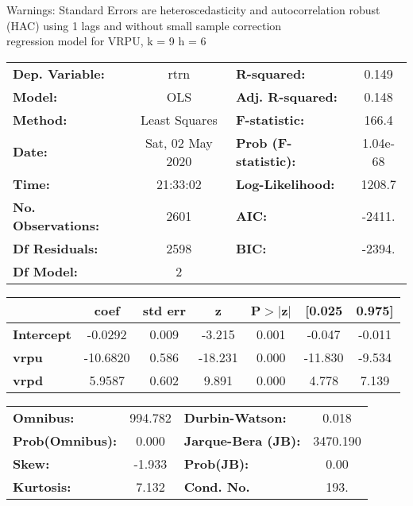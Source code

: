 Warnings: \newline
 [1] Standard Errors are heteroscedasticity and autocorrelation robust (HAC) using 1 lags and without small sample correction\\ 

regression model for VRPU, k = 9 h = 6\begin{center}
\begin{tabular}{lclc}
\toprule
\textbf{Dep. Variable:}    &       rtrn       & \textbf{  R-squared:         } &     0.149   \\
\textbf{Model:}            &       OLS        & \textbf{  Adj. R-squared:    } &     0.148   \\
\textbf{Method:}           &  Least Squares   & \textbf{  F-statistic:       } &     166.4   \\
\textbf{Date:}             & Sat, 02 May 2020 & \textbf{  Prob (F-statistic):} &  1.04e-68   \\
\textbf{Time:}             &     21:33:02     & \textbf{  Log-Likelihood:    } &    1208.7   \\
\textbf{No. Observations:} &        2601      & \textbf{  AIC:               } &    -2411.   \\
\textbf{Df Residuals:}     &        2598      & \textbf{  BIC:               } &    -2394.   \\
\textbf{Df Model:}         &           2      & \textbf{                     } &             \\
\bottomrule
\end{tabular}
\begin{tabular}{lcccccc}
                   & \textbf{coef} & \textbf{std err} & \textbf{z} & \textbf{P$> |$z$|$} & \textbf{[0.025} & \textbf{0.975]}  \\
\midrule
\textbf{Intercept} &      -0.0292  &        0.009     &    -3.215  &         0.001        &       -0.047    &       -0.011     \\
\textbf{vrpu}      &     -10.6820  &        0.586     &   -18.231  &         0.000        &      -11.830    &       -9.534     \\
\textbf{vrpd}      &       5.9587  &        0.602     &     9.891  &         0.000        &        4.778    &        7.139     \\
\bottomrule
\end{tabular}
\begin{tabular}{lclc}
\textbf{Omnibus:}       & 994.782 & \textbf{  Durbin-Watson:     } &    0.018  \\
\textbf{Prob(Omnibus):} &   0.000 & \textbf{  Jarque-Bera (JB):  } & 3470.190  \\
\textbf{Skew:}          &  -1.933 & \textbf{  Prob(JB):          } &     0.00  \\
\textbf{Kurtosis:}      &   7.132 & \textbf{  Cond. No.          } &     193.  \\
\bottomrule
\end{tabular}
\end{center}

